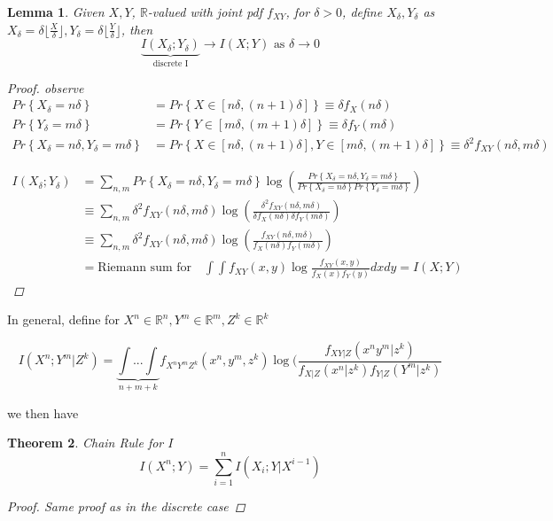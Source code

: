 \documentclass[twoside]{article}
\newtheorem{theorem}{Theorem}[section]
\newtheorem{lemma}[theorem]{Lemma}
\theoremstyle{definition} %
\renewcommand{\Pr}[1]{Pr\left\{#1\right\}}
\def\R{\mathbb{R}}
\begin{document}
\begin{lemma}
  Given $X, Y$, $\R$-valued with joint pdf $f_{XY}$, for $\delta > 0$, define $X_{\delta}, Y_{\delta}$ as $X_{\delta} = \delta \lfloor \frac{X}{\delta} \rfloor, Y_{\delta} = \delta \lfloor \frac{Y}{\delta} \rfloor$, then
  \[
    \underbrace{I(X_{\delta}; Y_{\delta})}_{\text{discrete I}} \rightarrow I(X ; Y) \text{ as } \delta \rightarrow 0
  \]

  \begin{proof}
    observe
    \begin{align*}
      \Pr{X_{\delta} = n \delta} &= \Pr{X \in [n \delta, (n+1)\delta]} \equiv \delta f_X(n \delta) \\
      \Pr{Y_{\delta} = m \delta} &= \Pr{Y \in [m \delta, (m+1)\delta]} \equiv \delta f_Y(m \delta) \\
      \Pr{X_{\delta} = n \delta, Y_{\delta} = m \delta}
      &= \Pr{X \in [n \delta, (n+1) \delta], Y \in [m \delta, (m+1)\delta]} \equiv \delta^2 f_{XY}(n \delta, m \delta)
    \end{align*}

    \begin{align*}
      I(X_{\delta} ; Y_{\delta})
      &= \sum_{n, m} \Pr{X_{\delta} = n \delta, Y_{\delta} = m \delta} \log(\frac{\Pr{X_{\delta} = n \delta, Y_{\delta} = m \delta}}{\Pr{X_{\delta} = n \delta} \Pr{Y_{\delta} = m \delta}}) \\
      &\equiv \sum_{n, m} \delta^2 f_{XY} (n \delta, m \delta) \log(\frac{\delta^2 f_{XY}(n \delta, m \delta)}{\delta f_X(n \delta) \delta f_Y(m \delta)}) \\
      &\equiv \sum_{n, m} \delta^2 f_{XY} (n \delta, m \delta) \log(\frac{f_{XY}(n \delta, m \delta)}{f_X(n \delta) f_Y(m \delta)}) \\
      &= \text{Riemann sum for} \quad \int \int f_{XY}(x,y) \log \frac{f_{XY}(x,y)}{f_X(x) f_Y(y)}dx dy = I(X ; Y)
    \end{align*}
  \end{proof}
\end{lemma}

In general, define for $X^n \in \R^n, Y^m \in \R^m, Z^k \in \R^k$

\[
  I(X^n ; Y^m | Z^k) = \underbrace{\int ... \int}_{n + m + k} f_{X^n Y^m Z^k}(x^n, y^m, z^k) \log(\frac{f_{XY|Z}(x^n y^m | z^k)}{f_{X|Z}(x^n | z^k) f_{Y|Z}(Y^m | z^k)}
\]

we then have

\begin{theorem}{Chain Rule for $I$}
  \[
    I(X^n ; Y) = \sum_{i = 1}^n I(X_i ; Y | X^{i - 1})
  \]
  \begin{proof}
    Same proof as in the discrete case
  \end{proof}
\end{theorem}
\end{document}
